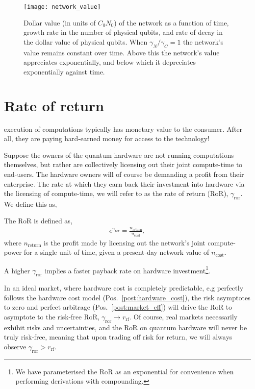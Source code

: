 \begin{figure}[!htbp]
	\texttt{[image: network\_value]}
	\captionspacefig \caption{Dollar value (in units of \mbox{$C_0N_0$}) of the network as a function of time, growth rate in the number of physical qubits, and rate of decay in the dollar value of physical qubits. When \mbox{$\gamma_N/\gamma_C=1$} the network's value remains constant over time. Above this the network's value appreciates exponentially, and below which it depreciates exponentially against time.} \label{fig:network_value}
\end{figure}

%
%

\section{Rate of return}

 execution of computations typically has monetary value to the consumer. After all, they are paying hard-earned money for access to the technology!

Suppose the owners of the quantum hardware are not running computations themselves, but rather are collectively licensing out their joint compute-time to end-users. The hardware owners will of course be demanding a profit from their enterprise. The rate at which they earn back their investment into hardware via the licensing of compute-time, we will refer to as the rate of return (RoR), $\gamma_\mathrm{ror}$. We define this as,

\begin{postulate}\label{post:RoR}
The RoR is defined as,
\begin{align}
e^{\gamma_\mathrm{ror}} = \frac{n_\mathrm{return}}{n_\mathrm{cost}},
\end{align}
where $n_\mathrm{return}$ is the profit made by licensing out the network's joint compute-power for a single unit of time, given a present-day network value of $n_\mathrm{cost}$.
\end{postulate}

A higher $\gamma_\mathrm{ror}$ implies a faster payback rate on hardware investment\footnote{We have parameterised the RoR as an exponential for convenience when performing derivations with compounding.}.

In an ideal market, where hardware cost is completely predictable, e.g perfectly follows the hardware cost model (Pos.~\ref{post:hardware_cost}), the risk asymptotes to zero and perfect arbitrage (Pos.~\ref{post:market_eff}) will drive the RoR to asymptote to the risk-free RoR, \mbox{$\gamma_\mathrm{ror} \to r_\mathrm{rf}$}. Of course, real markets necessarily exhibit risks and uncertainties, and the RoR on quantum hardware will never be truly risk-free, meaning that upon trading off risk for return, we will always observe \mbox{$\gamma_\mathrm{ror} > r_\mathrm{rf}$}.

